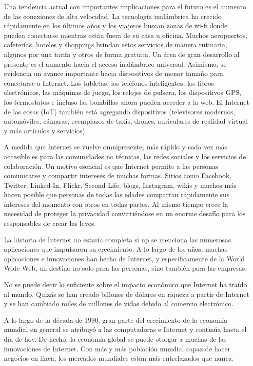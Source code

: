 \documentclass[12pt]{report} %
\begin{document}
Una tendencia actual con importantes implicaciones para el futuro es el aumento de las conexiones de alta velocidad. La tecnología inalámbrica ha crecido rápidamente en los últimos años y los viajeros buscan zonas de wi-fi donde pueden conectarse mientras están fuera de su casa u oficina. Muchos aeropuertos, cafeterías, hoteles y shoppings brindan estos servicios de manera rutinaria, algunos por una tarifa y otros de forma gratuita. Un área de gran desarrollo al presente es el aumento hacia el acceso inalámbrico universal. Asimismo, se evidencia un avance importante hacia dispositivos de menor tamaño para conectarse a Internet. Las tabletas, los teléfonos inteligentes, los libros electrónicos, las máquinas de juego, los relojes de pulsera, los dispositivos GPS, los termostatos e incluso las bombillas ahora pueden acceder a la web. El Internet de las cosas (IoT) también está agregando dispositivos (televisores modernos, automóviles, cámaras, reemplazos de taxis, drones, auriculares de realidad virtual y más artículos y servicios).

A medida que Internet se vuelve omnipresente, más rápido y cada vez más accesible es para las comunidades no técnicas, las redes sociales y los servicios de colaboración. Un motivo esencial es que Internet permite a las personas comunicarse y compartir intereses de muchas formas. Sitios como Facebook, Twitter, Linked-In, Flickr, Second Life, blogs, Instagram, wikis y muchos más hacen posible que personas de todas las edades compartan rápidamente sus intereses del momento con otros en todas partes. Al mismo tiempo crece la necesidad de proteger la privacidad convirtiéndose en un enorme desafío para los responsables de crear las leyes.


La historia de Internet no estaría completa si np se menciona las numerosas aplicaciones que impulsaron su crecimiento. A lo largo de los años, muchas aplicaciones e innovaciones han hecho de Internet, y específicamente de la World Wide Web, un destino no solo para las personas, sino también para las empresas. 

No se puede decir lo suficiente sobre el impacto económico que Internet ha traído al mundo. Quizás se han creado billones de dólares en riqueza a partir de Internet y se han cambiado miles de millones de vidas debido al comercio electrónico.

A lo largo de la década de 1990, gran parte del crecimiento de la economía mundial en general se atribuyó a las computadoras e Internet y continúa hasta el día de hoy. De hecho, la economía global se puede otorgar a muchas de las innovaciones de Internet. Con más y más población mundial capaz de hacer negocios en línea, los mercados mundiales están más entrelazados que nunca.
\end{document}
